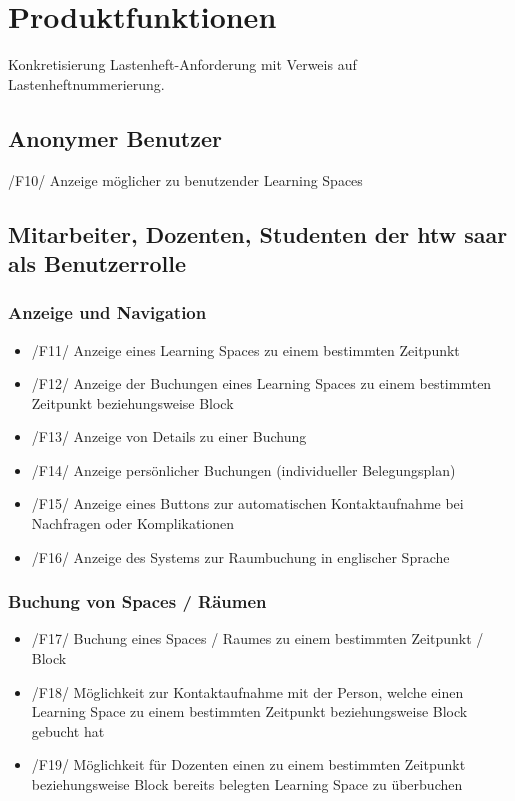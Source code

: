 \documentclass[a4paper,report,headsepline]{scrreprt}
\begin{document}

\chapter{Produktfunktionen}\label{produktfunktionen}
Konkretisierung Lastenheft-Anforderung mit Verweis auf Lastenheftnummerierung.

\section{Anonymer Benutzer}
/F10/ Anzeige möglicher zu benutzender Learning Spaces
\section{Mitarbeiter, Dozenten, Studenten der htw saar als Benutzerrolle}

\subsection{Anzeige und Navigation}
\begin{itemize}
\item /F11/ Anzeige eines Learning Spaces zu einem bestimmten Zeitpunkt
\item /F12/ Anzeige der Buchungen eines Learning Spaces zu einem bestimmten 
Zeitpunkt beziehungsweise Block
\item /F13/ Anzeige von Details zu einer Buchung
\item /F14/ Anzeige persönlicher Buchungen (individueller Belegungsplan)
\item /F15/ Anzeige eines Buttons zur automatischen Kontaktaufnahme bei Nachfragen oder Komplikationen
\item /F16/ Anzeige des Systems zur Raumbuchung in englischer Sprache
\end{itemize}

\subsection{Buchung von Spaces / Räumen}
\begin{itemize}
\item /F17/ Buchung eines Spaces / Raumes zu einem bestimmten Zeitpunkt / Block
\item /F18/ Möglichkeit zur Kontaktaufnahme mit der Person, welche einen Learning Space zu einem bestimmten Zeitpunkt beziehungsweise Block gebucht hat
\item /F19/ Möglichkeit für Dozenten einen zu einem bestimmten Zeitpunkt beziehungsweise Block bereits belegten Learning Space zu überbuchen
\end{itemize}
\end{document}
